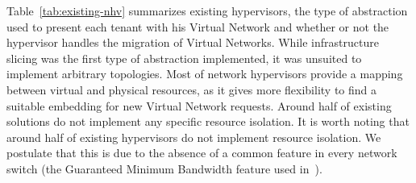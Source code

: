 Table~\ref{tab:existing-nhv} summarizes existing hypervisors, the type of abstraction used to present each tenant with his Virtual Network and whether or not the hypervisor handles the migration of Virtual Networks. While infrastructure slicing was the first type of abstraction implemented, it was unsuited to implement arbitrary topologies. Most of network hypervisors provide a mapping between virtual and physical resources, as it gives more flexibility to find a suitable embedding for new Virtual Network requests. Around half of existing solutions do not implement any specific resource isolation. It is worth noting that around half of existing hypervisors do not implement resource isolation. We postulate that this is due to the absence of a common feature in every network switch (\eg the Guaranteed Minimum Bandwidth feature used in~\cite{EnhancedFV-Min2012}).
